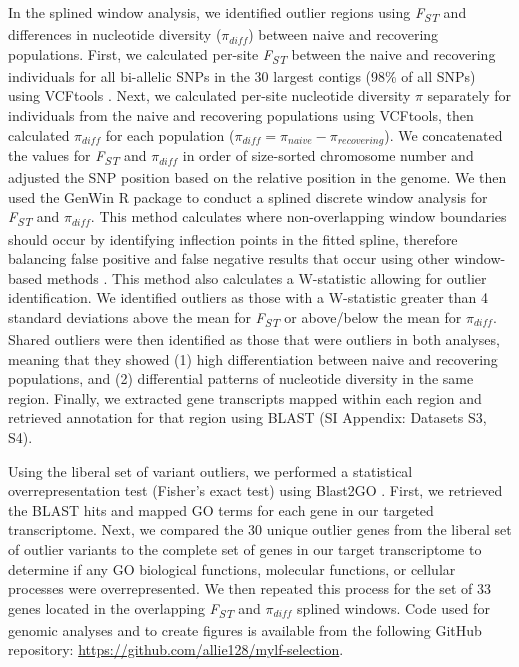\documentclass[9pt,twocolumn,twoside,lineno]{pnas-new}
\begin{document}
{In the splined window analysis, we identified outlier regions using
\emph{F\textsubscript{ST}} and differences in nucleotide diversity
(\(\pi_{diff}\)) between naive and recovering populations. First, we
calculated per-site \emph{F\textsubscript{ST}} between the naive and
recovering individuals for all bi-allelic SNPs in the 30 largest contigs
(98\% of all SNPs) using VCFtools \citep{danecek2011}. Next, we
calculated per-site nucleotide diversity \(\pi\) separately for
individuals from the naive and recovering populations using VCFtools,
then calculated \(\pi_{diff}\) for each population
(\(\pi_{diff} = \pi_{naive} - \pi_{recovering}\)). We concatenated the
values for \emph{F\textsubscript{ST}} and \(\pi_{diff}\) in order of
size-sorted chromosome number and adjusted the SNP position based on the
relative position in the genome. We then used the GenWin R package
\citep{beissinger2015} to conduct a splined discrete window analysis for
\emph{F\textsubscript{ST}} and \(\pi_{diff}\). This method calculates
where non-overlapping window boundaries should occur by identifying
inflection points in the fitted spline, therefore balancing false
positive and false negative results that occur using other window-based
methods \citep{beissinger2015}. This method also calculates a
W-statistic allowing for outlier identification. We identified outliers
as those with a W-statistic greater than 4 standard deviations above the
mean for \emph{F\textsubscript{ST}} or above/below the mean for
\(\pi_{diff}\). Shared outliers were then identified as those that were
outliers in both analyses, meaning that they showed (1) high
differentiation between naive and recovering populations, and (2)
differential patterns of nucleotide diversity in the same region.
Finally, we extracted gene transcripts mapped within each region and
retrieved annotation for that region using BLAST (SI Appendix: Datasets
S3, S4).

Using the liberal set of variant outliers, we performed a statistical
overrepresentation test (Fisher's exact test) using Blast2GO
\citep{conesa2005}. First, we retrieved the BLAST hits and mapped GO
terms for each gene in our targeted transcriptome. Next, we compared the
30 unique outlier genes from the liberal set of outlier variants to the
complete set of genes in our target transcriptome to determine if any GO
biological functions, molecular functions, or cellular processes were
overrepresented. We then repeated this process for the set of 33 genes
located in the overlapping \emph{F\textsubscript{ST}} and \(\pi_{diff}\)
splined windows. Code used for genomic analyses and to create figures is
available from the following GitHub repository:
\url{https://github.com/allie128/mylf-selection}.

}
\end{document}
